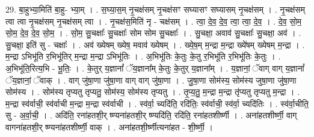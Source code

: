 \documentclass[17pt]{extarticle}
\begin{document}
29. बा॒हुभ्या॒मिति॑ बा॒हु- भ्या॒म् । . स॒घ्या॒स॒म् नृ॒चक्ष॑सम् नृ॒चक्ष॑सꣳ सघ्यासꣳ सघ्यासम् नृ॒चक्ष॑सम् । . नृ॒चक्ष॑सम् त्वा त्वा नृ॒चक्ष॑सम् नृ॒चक्ष॑सम् त्वा । . नृ॒चक्ष॑स॒मिति॑ नृ - चक्ष॑सम् । . त्वा॒ दे॒व॒ दे॒व॒ त्वा॒ त्वा॒ दे॒व॒ । . दे॒व॒ सो॒म॒ सो॒म॒ दे॒व॒ दे॒व॒ सो॒म॒ । . सो॒म॒ सु॒चक्षाः᳚ सु॒चक्षाः᳚ सोम सोम सु॒चक्षाः᳚ । . सु॒चक्षा॒ अवाव॑ सु॒चक्षाः᳚ सु॒चक्षा॒ अव॑ । . सु॒चक्षा॒ इति॑ सु - चक्षाः᳚ । . अव॑ ख्येषम् ख्येष॒ मवाव॑ ख्येषम् । . ख्ये॒ष॒म् म॒न्द्रा म॒न्द्रा ख्ये॑षम् ख्येषम् म॒न्द्रा । . म॒न्द्रा ऽभिभू॑ति र॒भिभू॑तिर् म॒न्द्रा म॒न्द्रा ऽभिभू॑तिः । . अ॒भिभू॑तिः के॒तुः के॒तु र॒भिभू॑ति र॒भिभू॑तिः के॒तुः । . अ॒भिभू॑ति॒रित्य॒भि - भू॒तिः॒ । . के॒तुर् य॒ज्ञानां᳚ ॅय॒ज्ञाना᳚म् के॒तुः के॒तुर् य॒ज्ञाना᳚म् । . य॒ज्ञानां॒ ॅवाग् वाग् य॒ज्ञानां᳚ ॅय॒ज्ञानां॒ ॅवाक् । . वाग् जु॑षा॒णा जु॑षा॒णा वाग् वाग् जु॑षा॒णा । . जु॒षा॒णा सोम॑स्य॒ सोम॑स्य जुषा॒णा जु॑षा॒णा सोम॑स्य । . सोम॑स्य तृप्यतु तृप्यतु॒ सोम॑स्य॒ सोम॑स्य तृप्यतु । . तृ॒प्य॒तु॒ म॒न्द्रा म॒न्द्रा तृ॑प्यतु तृप्यतु म॒न्द्रा । . म॒न्द्रा स्व॑र्वाची॒ स्व॑र्वाची म॒न्द्रा म॒न्द्रा स्व॑र्वाची । . स्व॑र्वा॒ च्यदि॑ति॒ रदि॑तिः॒ स्व॑र्वाची॒ स्व॑र्वा॒ च्यदि॑तिः । . स्व॑र्वा॒चीति॒ सु - अ॒र्वा॒ची॒ । . अदि॑ति॒ रना॑हतशी॒र् ‌ष्ण्यना॑हतशी॒र्‌ ष्ण्यदि॑ति॒ रदि॑ति॒ रना॑हतशीर्ष्णी । . अना॑हतशीर्ष्णी॒ वाग् वागना॑हतशी॒र्‌ ष्ण्यना॑हतशीर्ष्णी॒ वाक् । . अना॑हतशी॒र्ष्णीत्यना॑हत - शी॒र्ष्णी॒ । \newline
\end{document}
